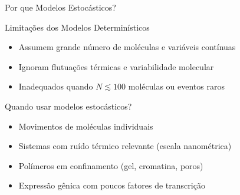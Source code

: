 \begin{frame}[shrink=10]{Por que Modelos Estocásticos?}
\begin{block}{Limitações dos Modelos Determinísticos}
\begin{itemize}
    \item Assumem grande número de moléculas e variáveis contínuas
    \item Ignoram flutuações térmicas e variabilidade molecular
    \item Inadequados quando $N \lesssim 100$ moléculas ou eventos raros
\end{itemize}
\end{block}

\vspace{0.3cm}

\begin{block}{Quando usar modelos estocásticos?}
\begin{itemize}
    \item Movimentos de moléculas individuais
    \item Sistemas com ruído térmico relevante (escala nanométrica)
    \item Polímeros em confinamento (gel, cromatina, poros)
    \item Expressão gênica com poucos fatores de transcrição
\end{itemize}
\end{block}

\end{frame}


